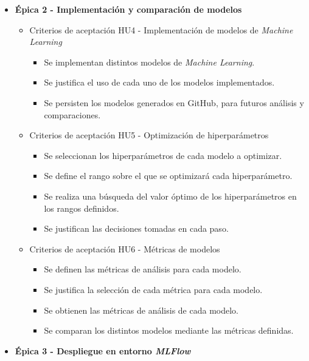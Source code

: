 \documentclass[
11pt, %
]{charter}
\begin{document}
\begin{itemize}
\begin{itemize}
\begin{itemize}
        \end{itemize}
    \end{itemize}
  \item \textbf{\'{E}pica 2 - Implementación y comparación de modelos}
    \begin{itemize}
      \item Criterios de aceptación HU4 - Implementación de modelos de \textit{Machine Learning}
        \begin{itemize}
            \item Se implementan distintos modelos de \textit{Machine Learning}.
            \item Se justifica el uso de cada uno de los modelos implementados.
            \item Se persisten los modelos generados en GitHub, para futuros análisis y comparaciones.
        \end{itemize}
      \item Criterios de aceptación HU5 - Optimización de hiperparámetros
        \begin{itemize}
            \item Se seleccionan los hiperparámetros de cada modelo a optimizar.
            \item Se define el rango sobre el que se optimizará cada hiperparámetro.
            \item Se realiza una búsqueda del valor óptimo de los hiperparámetros en los rangos definidos.
            \item Se justifican las decisiones tomadas en cada paso.
        \end{itemize}
      \item Criterios de aceptación HU6 - Métricas de modelos
        \begin{itemize}
            \item Se definen las métricas de análisis para cada modelo.
            \item Se justifica la selección de cada métrica para cada modelo.
            \item Se obtienen las métricas de análisis de cada modelo.
            \item Se comparan los distintos modelos mediante las métricas definidas.
        \end{itemize}
    \end{itemize}
  \item \textbf{\'{E}pica 3 - Despliegue en entorno \textit{MLFlow}}
    \begin{itemize}

\end{itemize}
\end{itemize}
\end{document}
